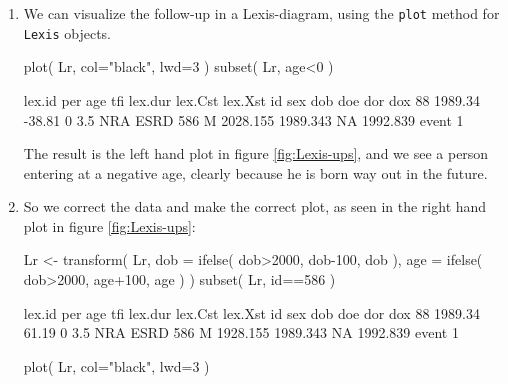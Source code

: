 \begin{enumerate}

\item We can visualize the follow-up in a Lexis-diagram, using the
  \texttt{plot} method for \texttt{Lexis} objects.
\begin{Schunk}
\begin{Sinput}
 plot( Lr, col="black", lwd=3 )
 subset( Lr, age<0 )
\end{Sinput}
\begin{Soutput}
 lex.id     per    age tfi lex.dur lex.Cst lex.Xst  id sex      dob      doe dor      dox
     88 1989.34 -38.81   0     3.5     NRA    ESRD 586   M 2028.155 1989.343  NA 1992.839
 event
     1
\end{Soutput}
\end{Schunk}
The result is the left hand plot in figure \ref{fig:Lexis-ups},
and we see a person entering at a negative age, clearly because he is
born way out in the future.


\item So we correct the data and make the correct plot, as seen in the right
   hand plot in figure \ref{fig:Lexis-ups}:
\begin{Schunk}
\begin{Sinput}
 Lr <- transform( Lr, dob = ifelse( dob>2000, dob-100, dob ),
                      age = ifelse( dob>2000, age+100, age ) )
 subset( Lr, id==586 )
\end{Sinput}
\begin{Soutput}
 lex.id     per   age tfi lex.dur lex.Cst lex.Xst  id sex      dob      doe dor      dox
     88 1989.34 61.19   0     3.5     NRA    ESRD 586   M 1928.155 1989.343  NA 1992.839
 event
     1
\end{Soutput}
\begin{Sinput}
 plot( Lr, col="black", lwd=3 )
\end{Sinput}
\end{Schunk}


\end{enumerate}
